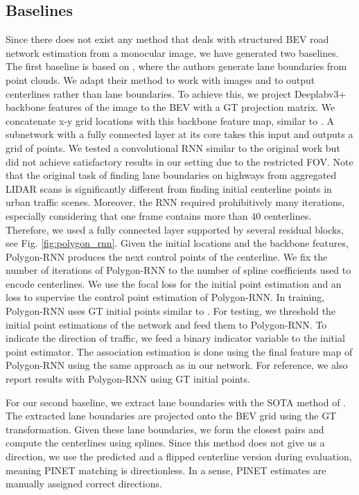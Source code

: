 \documentclass[10pt,twocolumn,letterpaper]{article}
\begin{document}
\subsection{Baselines}
Since there does not exist any method that deals with structured BEV road network estimation from a monocular image, we have generated two baselines. The first baseline is based on \cite{DBLP:conf/cvpr/HomayounfarMLU18}, where the authors generate lane boundaries from point clouds. We adapt their method to work with images and to output centerlines rather than lane boundaries. To achieve this, we project Deeplabv3+ \cite{DBLP:conf/eccv/ChenZPSA18} backbone features of the image to the BEV with a GT projection matrix. We concatenate x-y grid locations with this backbone feature map, similar to \cite{DBLP:conf/nips/LiuLMSFSY18}. A subnetwork with a fully connected layer at its core takes this input and outputs a grid of  points. 
We tested a convolutional RNN similar to the original work but did not achieve satisfactory results in our setting due to the restricted FOV. Note that the original task of finding lane boundaries on highways from aggregated LIDAR scans is significantly different from finding initial centerline points in urban traffic scenes. Moreover, the RNN required prohibitively many iterations, especially considering that one frame contains more than 40 centerlines.  
Therefore, we used a fully connected layer supported by several residual blocks, see Fig. \ref{fig:polygon_rnn}. Given the initial locations and the backbone features, Polygon-RNN \cite{DBLP:conf/cvpr/AcunaLKF18} produces the next control points of the centerline. We fix the number of iterations of Polygon-RNN to the number of spline coefficients used to encode centerlines. We use the focal loss \cite{DBLP:journals/pami/LinGGHD20} for the initial point estimation and an  loss to supervise the control point estimation of Polygon-RNN. In training, Polygon-RNN uses GT initial points similar to \cite{DBLP:conf/cvpr/HomayounfarMLU18}. For testing, we threshold the initial point estimations of the network and feed them to Polygon-RNN. To indicate the direction of traffic, we feed a binary indicator variable to the initial point estimator. The association estimation is done using the final feature map of Polygon-RNN using the same approach as in our network. For reference, we also report results with Polygon-RNN using GT initial points.




For our second baseline, we extract lane boundaries with the SOTA method of \cite{DBLP:journals/corr/abs-2002-06604}. The extracted lane boundaries are projected onto the BEV grid using the GT transformation. Given these lane boundaries, we form the closest pairs and compute the centerlines using splines. Since this method does not give us a direction, we use the predicted and a flipped centerline version during evaluation, meaning PINET matching is directionless. In a sense, PINET estimates are manually assigned correct directions.
\end{document}
